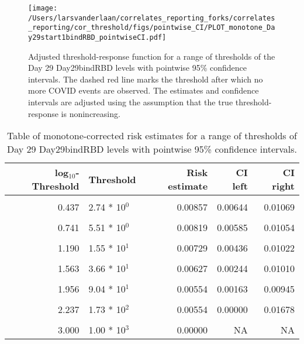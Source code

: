 \documentclass[]{article}
\begin{document}
\begin{figure}[H]
\centering
\texttt{[image: /Users/larsvanderlaan/correlates\_reporting\_forks/correlates\_reporting/cor\_threshold/figs/pointwise\_CI/PLOT\_monotone\_Day29start1bindRBD\_pointwiseCI.pdf]}
\caption{Adjusted threshold-response function for a range of thresholds of the
  Day 29 Day29bindRBD levels with pointwise 95\% confidence intervals. The dashed red line marks the threshold after which no more COVID events are observed. The estimates and confidence intervals are adjusted using the assumption that the true threshold-response is nonincreasing.}
\end{figure}
\begin{table}[!h]

\caption{\label{tab:unnamed-chunk-29}Table of monotone-corrected risk estimates for a range of thresholds of Day 29 Day29bindRBD levels with pointwise 95\% confidence intervals.}
\centering
\begin{tabular}[t]{rlrrr}
\toprule
log$_{10}$-Threshold & Threshold & Risk estimate & CI left & CI right\\
\midrule
\cellcolor{gray!6}{-0.099} & \cellcolor{gray!6}{7.96 * 10$^{1}$} & \cellcolor{gray!6}{0.00876} & \cellcolor{gray!6}{0.00674} & \cellcolor{gray!6}{0.01078}\\
0.437 & 2.74 * 10$^{0}$ & 0.00857 & 0.00644 & 0.01069\\
\cellcolor{gray!6}{0.585} & \cellcolor{gray!6}{3.85 * 10$^{0}$} & \cellcolor{gray!6}{0.00857} & \cellcolor{gray!6}{0.00630} & \cellcolor{gray!6}{0.01083}\\
0.741 & 5.51 * 10$^{0}$ & 0.00819 & 0.00585 & 0.01054\\
\cellcolor{gray!6}{1.000} & \cellcolor{gray!6}{1.00 * 10$^{1}$} & \cellcolor{gray!6}{0.00788} & \cellcolor{gray!6}{0.00543} & \cellcolor{gray!6}{0.01033}\\
1.190 & 1.55 * 10$^{1}$ & 0.00729 & 0.00436 & 0.01022\\
\cellcolor{gray!6}{1.371} & \cellcolor{gray!6}{2.35 * 10$^{1}$} & \cellcolor{gray!6}{0.00671} & \cellcolor{gray!6}{0.00343} & \cellcolor{gray!6}{0.00998}\\
1.563 & 3.66 * 10$^{1}$ & 0.00627 & 0.00244 & 0.01010\\
\cellcolor{gray!6}{1.852} & \cellcolor{gray!6}{7.11 * 10$^{1}$} & \cellcolor{gray!6}{0.00621} & \cellcolor{gray!6}{0.00179} & \cellcolor{gray!6}{0.01063}\\
1.956 & 9.04 * 10$^{1}$ & 0.00554 & 0.00163 & 0.00945\\
\cellcolor{gray!6}{2.083} & \cellcolor{gray!6}{1.21 * 10$^{2}$} & \cellcolor{gray!6}{0.00554} & \cellcolor{gray!6}{0.00000} & \cellcolor{gray!6}{0.01678}\\
2.237 & 1.73 * 10$^{2}$ & 0.00554 & 0.00000 & 0.01678\\
\cellcolor{gray!6}{2.699} & \cellcolor{gray!6}{5.00 * 10$^{2}$} & \cellcolor{gray!6}{0.00000} & \cellcolor{gray!6}{NA} & \cellcolor{gray!6}{NA}\\
3.000 & 1.00 * 10$^{3}$ & 0.00000 & NA & NA\\
\bottomrule
\end{tabular}
\end{table}
\end{document}
